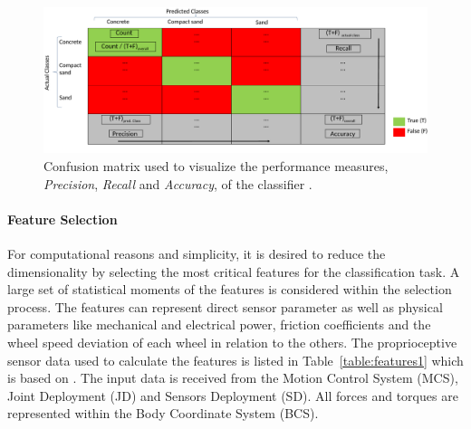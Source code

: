 \begin{figure}[!htbp]
    \centering
    \includegraphics[width=\textwidth]{../figures/CM_Description.pdf}
    \caption{\label{fig:CMdescrpit} Confusion matrix used to visualize the performance measures, \emph{Precision}, \emph{Recall} and \emph{Accuracy}, of the classifier \citep{kuhr2021}.}
\end{figure}


\paragraph*{Feature Selection}
For computational reasons and simplicity, it is desired to reduce the dimensionality by selecting the most critical features for the  classification task.
A large set of statistical moments of the features is considered within the selection process. 
The features can represent direct sensor parameter as well as physical parameters like mechanical and electrical power, friction coefficients and the wheel speed deviation of each wheel in relation to the others. 
The proprioceptive sensor data used to calculate the features is listed in Table~\ref{table:features1} which is based on \citep{Dimastrogiovanni2020}.
The input data is received from the Motion Control System (MCS), Joint Deployment (JD) and Sensors Deployment (SD). 
All forces and torques are represented within the Body Coordinate System (BCS).

\pagebreak

